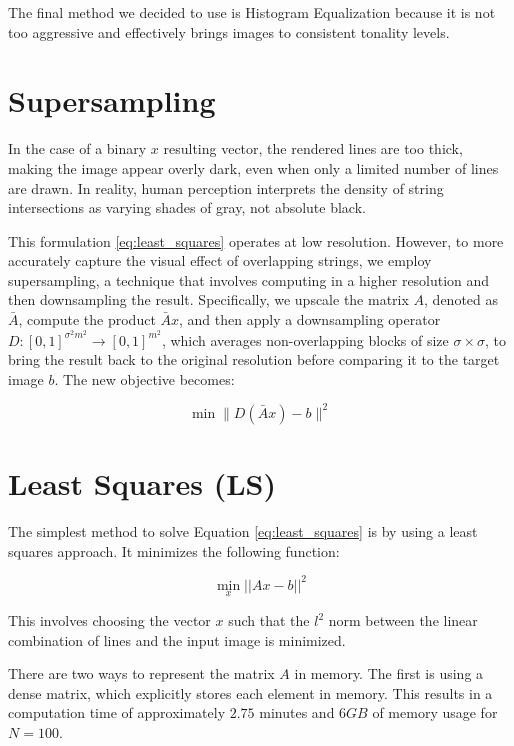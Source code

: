 The final method we decided to use is Histogram Equalization because it is not too aggressive and effectively brings images to consistent tonality levels.

\section{Supersampling} \label{sec:supersampling}

In the case of a binary \(x\) resulting vector, the rendered lines are too thick, making the image appear overly dark, even when only a limited number of lines are drawn. In reality, human perception interprets the density of string intersections as varying shades of gray, not absolute black.

This formulation \ref{eq:least_squares} operates at low resolution. However, to more accurately capture the visual effect of overlapping strings, we employ supersampling, a technique that involves computing in a higher resolution and then downsampling the result. Specifically, we upscale the matrix \(A\), denoted as \(\bar{A}\), compute the product \(\bar{A}x\), and then apply a downsampling operator \(D : \left[ 0, 1\right] ^ {\sigma^2m^2} \rightarrow \left[ 0, 1\right] ^ {m^2}\), which averages non-overlapping blocks of size \(\sigma \times \sigma\), to bring the result back to the original resolution before comparing it to the target image \(b\). The new objective becomes:

\begin{equation}
\label{eq:supersampling}
\min{\| D(\bar{A} x) - b \|^2}
\end{equation}

\section{Least Squares (LS)}

The simplest method to solve Equation \ref{eq:least_squares} is by using a least squares approach. It minimizes the following function:

\begin{equation}
\min_{x}{||Ax - b||^2}
\end{equation}

This involves choosing the vector \(x\) such that the \(l^2\) norm between the linear combination of lines and the input image is minimized.

There are two ways to represent the matrix \(A\) in memory. The first is using a dense matrix, which explicitly stores each element in memory. This results in a computation time of approximately \(2.75\) minutes and \(6GB\) of memory usage for \(N=100\). 

